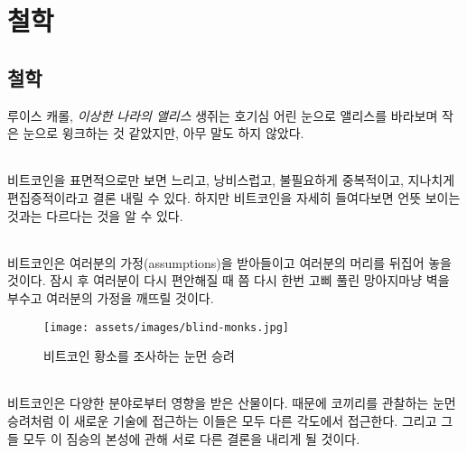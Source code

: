 \part{철학}
\label{ch:philosophy}
\chapter*{철학}

\begin{chapquote}{루이스 캐롤, \textit{이상한 나라의 앨리스}}
	생쥐는 호기심 어린 눈으로 앨리스를 바라보며 작은 눈으로 윙크하는 것 같았지만, 아무 말도 하지 않았다.
\end{chapquote}

\paragraph{}
비트코인을 표면적으로만 보면 느리고, 낭비스럽고, 불필요하게 중복적이고, 지나치게 편집증적이라고 결론 내릴 수 있다. 
하지만 비트코인을 자세히 들여다보면 언뜻 보이는 것과는 다르다는 것을 알 수 있다.

\paragraph{}
비트코인은 여러분의 가정(assumptions)을 받아들이고 여러분의 머리를 뒤집어 놓을 것이다.
잠시 후 여러분이 다시 편안해질 때 쯤 다시 한번 고삐 풀린 망아지마냥 벽을 부수고 여러분의 가정을 깨뜨릴 것이다.

\begin{figure}
	\texttt{[image: assets/images/blind-monks.jpg]}
	\caption{비트코인 황소를 조사하는 눈먼 승려}
	\label{fig:blind-monks}
\end{figure}

\paragraph{}
비트코인은 다양한 분야로부터 영향을 받은 산물이다.
때문에 코끼리를 관찰하는 눈먼 승려처럼 이 새로운 기술에 접근하는 이들은 모두 다른 각도에서 접근한다.
그리고 그들 모두 이 짐승의 본성에 관해 서로 다른 결론을 내리게 될 것이다.

